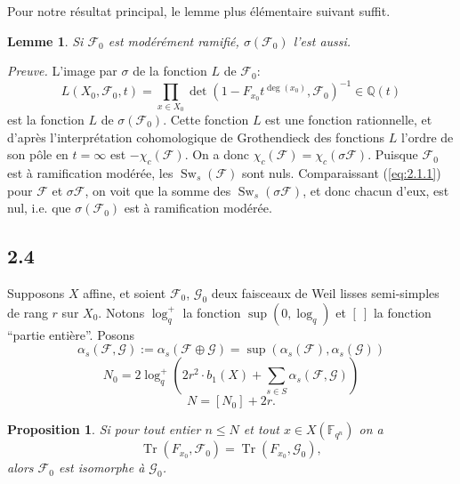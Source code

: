 \documentclass[11pt,a4paper]{article}
\theoremstyle{plain}
\newtheorem{lemma}[theorem]{Lemme}
\newtheorem{proposition}[theorem]{Proposition}
\theoremstyle{definition}
\DeclareMathOperator{\Sw}{Sw}
\DeclareMathOperator{\tr}{Tr}
\begin{document}
Pour notre r\'esultat principal, le lemme plus \'el\'ementaire suivant suffit.

\begin{lemma}\label{lem:2.3}
Si $\mathcal{F}_0$ est mod\'er\'ement ramifi\'e, $\sigma(\mathcal{F}_0)$ l'est aussi.
\end{lemma}

\noindent\textit{Preuve.} L'image par $\sigma$ de la fonction $L$ de $\mathcal{F}_0$:
\[
L(X_0, \mathcal{F}_0, t) = \prod_{x \in X_0} \det(1 - F_{x_0} t^{\deg(x_0)}, \mathcal{F}_0)^{-1} \in \mathbb{Q}(t)
\]
est la fonction $L$ de $\sigma(\mathcal{F}_0)$. Cette fonction $L$ est une fonction rationnelle, et d'apr\`es l'interpr\'etation cohomologique de Grothendieck des fonctions $L$ l'ordre de son p\^ole en $t = \infty$ est $-\chi_c(\mathcal{F})$. On a donc $\chi_c(\mathcal{F}) = \chi_c(\sigma \mathcal{F})$. Puisque $\mathcal{F}_0$ est \`a ramification mod\'er\'ee, les $\Sw_s(\mathcal{F})$ sont nuls. Comparaissant (\ref{eq:2.1.1}) pour $\mathcal{F}$ et $\sigma \mathcal{F}$, on voit que la somme des $\Sw_s(\sigma \mathcal{F})$, et donc chacun d'eux, est nul, i.e. que $\sigma(\mathcal{F}_0)$ est \`a ramification mod\'er\'ee.

\subsection{2.4}

Supposons $X$ affine, et soient $\mathcal{F}_0$, $\mathcal{G}_0$ deux faisceaux de Weil lisses semi-simples de rang $r$ sur $X_0$. Notons $\log_q^+$ la fonction $\sup(0, \log_q)$ et $[\ ]$ la fonction ``partie enti\`ere''. Posons
\begin{equation}\label{eq:2.4.1}
\alpha_s(\mathcal{F}, \mathcal{G}) := \alpha_s(\mathcal{F} \oplus \mathcal{G}) = \sup(\alpha_s(\mathcal{F}), \alpha_s(\mathcal{G}))
\end{equation}
\begin{equation}\label{eq:2.4.2}
N_0 = 2\log_q^+\left(2r^2 \cdot b_1(X) + \sum_{s \in S} \alpha_s(\mathcal{F}, \mathcal{G})\right)
\end{equation}
\begin{equation}\label{eq:2.4.3}
N = [N_0] + 2r.
\end{equation}

\begin{proposition}\label{prop:2.5}
Si pour tout entier $n \leq N$ et tout $x \in X(\mathbb{F}_{q^n})$ on a
\[
\tr(F_{x_0}, \mathcal{F}_0) = \tr(F_{x_0}, \mathcal{G}_0),
\]
alors $\mathcal{F}_0$ est isomorphe \`a $\mathcal{G}_0$.
\end{proposition}
\end{document}
